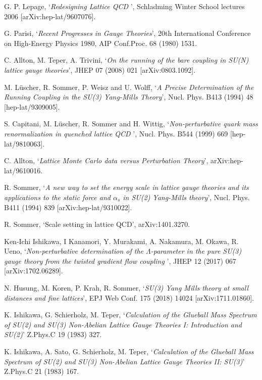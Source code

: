 \documentclass[12pt]{article}
\begin{document}
\begin{thebibliography}{99}
  G. P. Lepage,
  `{\it Redesigning Lattice QCD }',
  Schladming Winter School lectures 2006  [arXiv:hep-lat/9607076].

  G. Parisi,
  `{\it Recent Progresses in Gauge Theories}',
  20th International Conference on High-Energy Physics 1980, AIP Conf.Proc. 68 (1980) 1531.

  C. Allton, M. Teper, A. Trivini,
  `{\it On the running of the bare coupling in SU(N) lattice gauge theories}',
  JHEP 07 (2008) 021 [arXiv:0803.1092].

 M. L\"uscher, R. Sommer, P. Weisz and U. Wolff,
`{\it A Precise Determination of the Running Coupling in the SU(3) Yang-Mills Theory}',
 Nucl. Phys. B413 (1994) 48 [hep-lat/9309005].

  S. Capitani, M. L\"uscher, R. Sommer and H. Wittig,
  `{\it Non-perturbative quark mass renormalization in quenched lattice QCD }',
  Nucl. Phys. B544 (1999) 669 [hep-lat/9810063].

  C. Allton,
  `{\it Lattice Monte Carlo data versus Perturbation Theory}',
  arXiv:hep-lat/9610016.

  R. Sommer,
  `{\it A new way to set the energy scale in lattice gauge theories and its applications to the static force and $\alpha_s$ in SU(2) Yang-Mills theory}',
  Nucl. Phys. B411 (1994) 839 [arXiv:hep-lat/9310022].

  R. Sommer,
  `{Scale setting in lattice QCD}',
  arXiv:1401.3270.

  Ken-Ichi Ishikawa, I Kanamori, Y. Murakami, A. Nakamura, M. Okawa, R. Ueno,
  `{\it Non-perturbative determination of the $\Lambda$-parameter in the pure SU(3) gauge theory
    from the twisted gradient flow coupling }',
  JHEP 12 (2017) 067 [arXiv:1702.06289].
  
  N. Husung, M. Koren, P. Krah, R. Sommer,
  `{\it SU(3) Yang Mills theory at small distances and fine lattices}',
  EPJ Web Conf. 175 (2018) 14024  [arXiv:1711.01860].

  K. Ishikawa, G. Schierholz, M. Teper,
  `{\it Calculation of the Glueball Mass Spectrum of SU(2) and SU(3) Non-Abelian
    Lattice Gauge Theories I: Introduction and SU(2)}'
  Z.Phys.C 19 (1983) 327.

  K. Ishikawa, A. Sato, G. Schierholz, M. Teper,
  `{\it Calculation of the Glueball Mass Spectrum of SU(2) and SU(3) Non-Abelian
    Lattice Gauge Theories II: SU(3)}'
  Z.Phys.C 21 (1983) 167.


\end{thebibliography}
\end{document}
